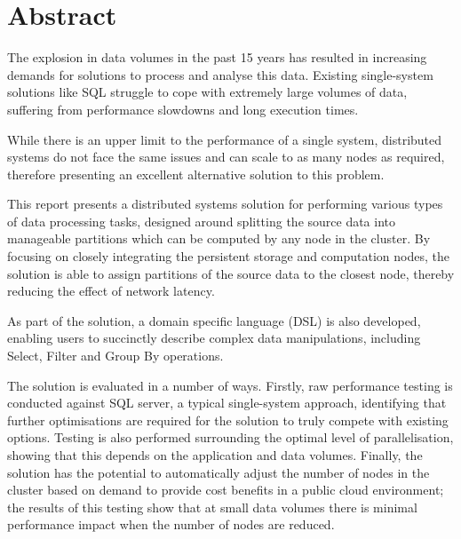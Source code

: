 \chapter*{Abstract}

The explosion in data volumes in the past 15 years has resulted in increasing demands for solutions to process and analyse this data. Existing single-system solutions like SQL struggle to cope with extremely large volumes of data, suffering from performance slowdowns and long execution times. 

While there is an upper limit to the performance of a single system, distributed systems do not face the same issues and can scale to as many nodes as required, therefore presenting an excellent alternative solution to this problem.

This report presents a distributed systems solution for performing various types of data processing tasks, designed around splitting the source data into manageable partitions which can be computed by any node in the cluster. By focusing on closely integrating the persistent storage and computation nodes, the solution is able to assign partitions of the source data to the closest node, thereby reducing the effect of network latency. 

As part of the solution, a domain specific language (DSL) is also developed, enabling users to succinctly describe complex data manipulations, including Select, Filter and Group By operations.

The solution is evaluated in a number of ways. Firstly, raw performance testing is conducted against SQL server, a typical single-system approach, identifying that further optimisations are required for the solution to truly compete with existing options. Testing is also performed surrounding the optimal level of parallelisation, showing that this depends on the application and data volumes. Finally, the solution has the potential to automatically adjust the number of nodes in the cluster based on demand to provide cost benefits in a public cloud environment; the results of this testing show that at small data volumes there is minimal performance impact when the number of nodes are reduced.

